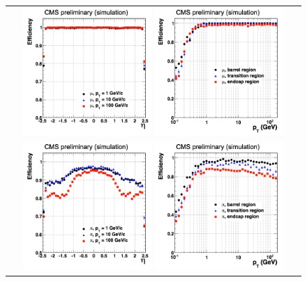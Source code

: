 \begin{figure}[htp] 
\centering 
\begin{tabular}{c} 
\includegraphics[width=0.45\textwidth]{figures/eff_muon_vs_eta.png} 
\includegraphics[width=0.45\textwidth]{figures/eff_muon_vs_pt.png} \\
\includegraphics[width=0.45\textwidth]{figures/eff_pion_vs_eta.png} 
\includegraphics[width=0.45\textwidth]{figures/eff_pion_vs_pt.png} 

\end{tabular}
\end{figure}
